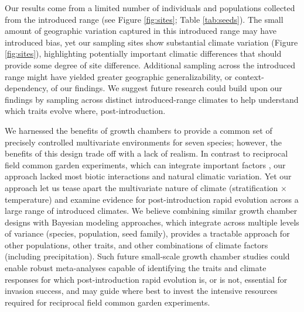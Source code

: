 \documentclass[11pt]{article}\usepackage[]{graphicx}\usepackage[]{color}
\begin{document}
	Our results come from a limited number of individuals and populations collected from the introduced range (see Figure \ref{fig:sites}; Table \ref{tab:seeds}). The small amount of geographic variation captured in this introduced range may have introduced bias, yet our sampling sites show substantial climate variation (Figure \ref{fig:sites}), highlighting potentially important climatic differences that should provide some degree of site difference.  Additional sampling across the introduced range might have yielded greater geographic generalizability, or context-dependency, of our findings. We suggest future research could build upon our findings by sampling across distinct introduced-range climates to  help understand which traits evolve where, post-introduction. %
	
	We harnessed the benefits of growth chambers to provide a common set of precisely controlled multivariate environments for seven species; however, the benefits of this design trade off with a lack of realism. In contrast to reciprocal field common garden experiments, which can integrate important factors \parencite{Germain2018,Blois2013}, our approach lacked most biotic interactions and natural climatic variation. Yet our approach let us tease apart the multivariate nature of climate (stratification $\times$ temperature) and examine evidence for post-introduction rapid evolution across a large range of introduced climates. We believe combining similar growth chamber designs with Bayesian modeling approaches, which integrate across multiple levels of variance (species, population, seed family), provides a tractable approach for other populations, other traits, and other combinations of climate factors (including precipitation). Such future small-scale growth chamber studies could enable robust meta-analyses capable of identifying the traits and climate responses for which post-introduction rapid evolution is, or is not, essential for invasion success, and may guide where best to invest the intensive resources required for reciprocal field common garden experiments. 
	
\end{document}
